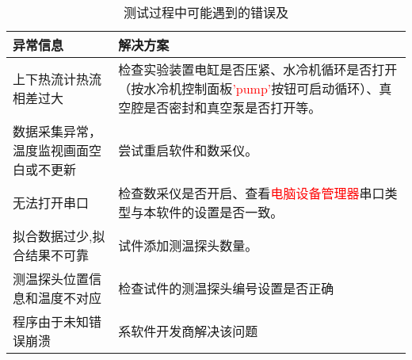 \begin{table}[htbp]
    \centering
    \caption{ 测试过程中可能遇到的错误及 \label{tab:errorInfo}}
    \begin{tabular}{@{}p{3cm}p{10cm}@{}}
        \toprule
        异常信息                        & 解决方案                                     \\ \midrule
        上下热流计热流相差过大& 检查实验装置电缸是否压紧、水冷机循环是否打开（按水冷机控制面板\textcolor{red}{'pump'}按钮可启动循环）、真空腔是否密封和真空泵是否打开等。\\
        数据采集异常，温度监视画面空白或不更新&尝试重启软件和数采仪。\\
        无法打开串口&检查数采仪是否开启、查看\textcolor{red}{电脑设备管理器}串口类型与本软件的设置是否一致。\\
        拟合数据过少,拟合结果不可靠&试件添加测温探头数量。\\ 
        测温探头位置信息和温度不对应&检查试件的测温探头编号设置是否正确\\ 
        程序由于未知错误崩溃&系软件开发商解决该问题\\
        \bottomrule
    \end{tabular}
\end{table}

